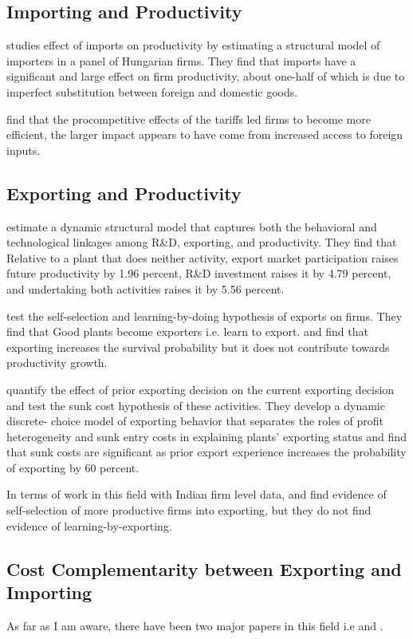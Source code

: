 \documentclass[11pt]{article}
\begin{document}
\subsection{Importing and Productivity}
\cite{halpern2011imported} studies effect of imports on productivity by estimating a structural
model of importers in a panel of Hungarian firms. They find that imports have
a significant and large effect on firm productivity, about one-half of which is due
to imperfect substitution between foreign and domestic goods. 

\cite{topalova2011trade} find that the procompetitive
effects of the tariffs led firms to become more
efficient, the larger impact appears to have come from 
increased access to foreign inputs.
\subsection{Exporting and Productivity}
\cite{aw2011}  estimate a dynamic structural model that captures both the behavioral
and technological linkages among R\&D, exporting, and
productivity. They find that Relative to a
plant that does neither activity, export market participation raises future productivity
by 1.96 percent, R\&D investment raises it by 4.79 percent, and undertaking both
activities raises it by 5.56 percent. 

 \cite{bernard1999exceptional} test the self-selection and
 learning-by-doing hypothesis of exports on firms. They find that Good
 plants become exporters i.e. learn to export. and find that exporting
 increases the survival probability but it does not contribute towards
 productivity growth.  

\cite{roberts1997decision} quantify the effect of prior exporting
decision on the current exporting decision and test the sunk cost
hypothesis of these activities.  They  develop a dynamic discrete-
 choice model of exporting behavior that separates the roles of profit heterogeneity
 and sunk entry costs in explaining plants' exporting status and find
 that sunk costs are significant as prior export experience increases
 the probability of exporting by 60 percent.  


In terms of work in this field with Indian firm level  data,
\cite{haidar2012trade} and \cite{gupta2018exporting} find evidence of
self-selection of more productive firms into exporting, but they do
not find evidence of learning-by-exporting.  
\subsection{Cost Complementarity between Exporting and Importing}
As far as I am aware, there have been two major papers in this field
i.e \cite{aristei2013firms} and \cite{kasahara2013productivity}. 
\end{document}
